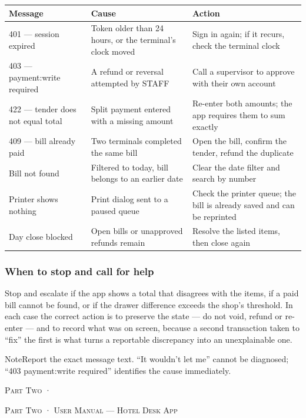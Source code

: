 \documentclass[11pt,a4paper,oneside]{book}
\begin{document}
\begin{center}\small
\begin{tabularx}{\linewidth}{|X|X|X|}
\hline
\rowcolor{lightgrey}
\textbf{Message} & \textbf{Cause} & \textbf{Action} \\ \hline
401 — session expired & Token older than 24 hours, or the terminal's clock moved & Sign in again; if it recurs, check the terminal clock \\ \hline
403 — payment:write required & A refund or reversal attempted by STAFF & Call a supervisor to approve with their own account \\ \hline
422 — tender does not equal total & Split payment entered with a missing amount & Re-enter both amounts; the app requires them to sum exactly \\ \hline
409 — bill already paid & Two terminals completed the same bill & Open the bill, confirm the tender, refund the duplicate \\ \hline
Bill not found & Filtered to today, bill belongs to an earlier date & Clear the date filter and search by number \\ \hline
Printer shows nothing & Print dialog sent to a paused queue & Check the printer queue; the bill is already saved and can be reprinted \\ \hline
Day close blocked & Open bills or unapproved refunds remain & Resolve the listed items, then close again \\ \hline
\end{tabularx}
\end{center}
\subsubsection*{When to stop and call for help}
Stop and escalate if the app shows a total that disagrees with the items, if a paid bill cannot be found, or if the drawer difference exceeds the shop's threshold. In each case the correct action is to preserve the state — do not void, refund or re-enter — and to record what was on screen, because a second transaction taken to “fix” the first is what turns a reportable discrepancy into an unexplainable one.

\begin{notebox}NoteReport the exact message text. “It wouldn't let me” cannot be diagnosed; “403 payment:write required” identifies the cause immediately.\end{notebox}
\textsc{\small\color{crimson}Part Two ·}\par\medskip
\textsc{\small\color{crimson}Part Two · User Manual — Hotel Desk App}\par\medskip
\end{document}
